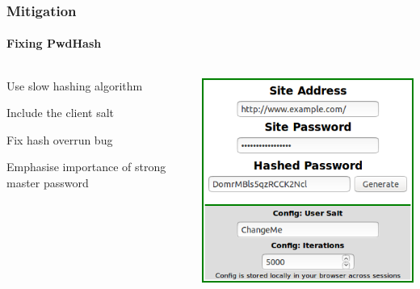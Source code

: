 \documentclass[handout, notes=hide]{beamer}
\begin{document}

\begin{frame}
\frametitle{Mitigation}
\framesubtitle{Fixing PwdHash}
\setlength{\parskip}{0.5em}

\begin{columns}[T]
\begin{column}[T]{0.6\textwidth}
\setlength{\parskip}{0.5em}

Use slow hashing algorithm

Include the client salt

Fix hash overrun bug

Emphasise importance of strong master password

\end{column}
\begin{column}[T]{0.4\textwidth}
\vspace{0.0em}
\includegraphics[width=1.0\textwidth]{pwdhash-poc}
\end{column}
\end{columns}

\end{frame}
\end{document}
